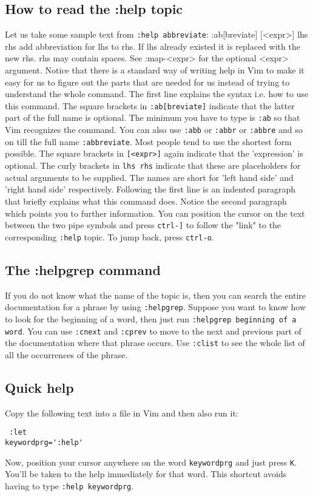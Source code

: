 \subsection{How to read the :help topic} 
Let us take some sample text from \texttt{:help abbreviate}:
:ab[breviate] [<expr>] {lhs} {rhs} add abbreviation for {lhs} to {rhs}. If
{lhs} already existed it is replaced with the new {rhs}. {rhs} may contain
spaces. See :map-<expr> for the optional <expr> argument. Notice that there
is a standard way of writing help in Vim to make it easy for us to figure out
the parts that are needed for us instead of trying to understand the whole
command. The first line explains the syntax i.e. how to use this command. The
square brackets in \texttt{:ab[breviate]} indicate that the latter part of the
full name is optional. The minimum you have to type is \texttt{:ab} so that Vim
recognizes the command. You can also use \texttt{:abb} or \texttt{:abbr} or
\texttt{:abbre} and so on till the full name \texttt{:abbreviate}. Most people
tend to use the shortest form possible. The square brackets in
\texttt{[<expr>]} again indicate that the 'expression' is optional. The curly
brackets in \texttt{{lhs} {rhs}} indicate that these are placeholders for
actual arguments to be supplied. The names are short for 'left hand side' and
'right hand side' respectively. Following the first line is an indented
paragraph that briefly explains what this command does. Notice the second
paragraph which points you to further information. You can position the cursor
on the text between the two pipe symbols and press \texttt{ctrl-]} to follow
the "link" to the corresponding \texttt{:help} topic. To jump back, press
\texttt{ctrl-o}. 

\subsection{The :helpgrep command} 
If you do not know what the name of the topic is, then you can search the
entire documentation for a phrase by using \texttt{:helpgrep}. Suppose you want
to know how to look for the beginning of a word, then just run
\texttt{:helpgrep beginning of a word}. You can use \texttt{:cnext} and
\texttt{:cprev} to move to the next and previous part of the documentation
where that phrase occurs. Use \texttt{:clist} to see
the whole list of all the occurrences of the phrase. 

\subsection{Quick help}
Copy the following text into a file in Vim and then also run it: \begin{lstlisting} :let
keywordprg=':help' \end{lstlisting} Now, position your cursor anywhere on the
word \texttt{keywordprg} and just press \texttt{K}. You'll be taken to the help
immediately for that word. This shortcut avoids having to type \texttt{:help
keywordprg}. 

